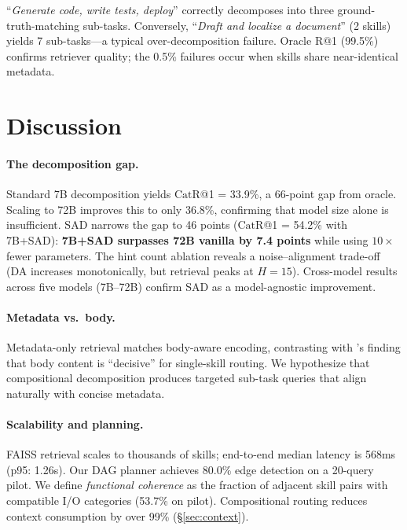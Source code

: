 \documentclass[11pt]{article}
\newcommand{\catrecall}{\text{CatR}}
\begin{document}
``\textit{Generate code, write tests, deploy}'' correctly decomposes into three ground-truth-matching sub-tasks.
Conversely, ``\textit{Draft and localize a document}'' (2 skills) yields 7 sub-tasks---a typical over-decomposition failure.
Oracle R@1 (99.5\%) confirms retriever quality; the 0.5\% failures occur when skills share near-identical metadata.

\section{Discussion}
\label{sec:discussion}

\paragraph{The decomposition gap.}
Standard 7B decomposition yields $\catrecall$@1 = 33.9\%, a 66-point gap from oracle.
Scaling to 72B improves this to only 36.8\%, confirming that model size alone is insufficient.
SAD narrows the gap to 46 points ($\catrecall$@1 = 54.2\% with 7B+SAD): \textbf{7B+SAD surpasses 72B vanilla by 7.4 points} while using $10\times$ fewer parameters.
The hint count ablation reveals a noise--alignment trade-off (DA increases monotonically, but retrieval peaks at $H{=}15$).
Cross-model results across five models (7B--72B) confirm SAD as a model-agnostic improvement.

\paragraph{Metadata vs.\ body.}
Metadata-only retrieval matches body-aware encoding, contrasting with \citet{xu2025skillrouter}'s finding that body content is ``decisive'' for single-skill routing.
We hypothesize that compositional decomposition produces targeted sub-task queries that align naturally with concise metadata.

\paragraph{Scalability and planning.}
FAISS retrieval scales to thousands of skills; end-to-end median latency is 568ms (p95: 1.26s).
Our DAG planner achieves 80.0\% edge detection on a 20-query pilot.
We define \emph{functional coherence} as the fraction of adjacent skill pairs with compatible I/O categories (53.7\% on pilot).
Compositional routing reduces context consumption by over 99\% (\S\ref{sec:context}).
\end{document}
